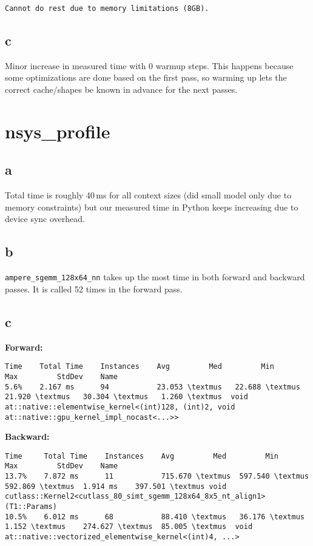 \documentclass{article}
\begin{document}
\begin{lstlisting}
Cannot do rest due to memory limitations (8GB).
\end{lstlisting}

\subsection*{c}
Minor increase in measured time with 0 warmup steps. This happens because some optimizations are done based on the first pass, so warming up lets the correct cache/shapes be known in advance for the next passes.

\newpage
\section{nsys\_profile}

\subsection*{a}
Total time is roughly 40\,ms for all context sizes (did small model only due to memory constraints) but our measured time in Python keeps increasing due to device sync overhead.

\subsection*{b}
\texttt{ampere\_sgemm\_128x64\_nn} takes up the most time in both forward and backward passes. It is called 52 times in the forward pass.

\subsection*{c}
\textbf{Forward:}
\begin{lstlisting}
Time    Total Time    Instances    Avg         Med         Min         Max         StdDev    Name
5.6%    2.167 ms      94           23.053 \textmus   22.688 \textmus   21.920 \textmus   30.304 \textmus   1.260 \textmus  void at::native::elementwise_kernel<(int)128, (int)2, void at::native::gpu_kernel_impl_nocast<...>>
\end{lstlisting}

\noindent\textbf{Backward:}
\begin{lstlisting}
Time     Total Time    Instances    Avg         Med         Min         Max         StdDev    Name
13.7%    7.872 ms      11           715.670 \textmus  597.540 \textmus  592.869 \textmus  1.914 ms    397.501 \textmus void cutlass::Kernel2<cutlass_80_simt_sgemm_128x64_8x5_nt_align1>(T1::Params)
10.5%    6.012 ms      68           88.410 \textmus   36.176 \textmus   1.152 \textmus    274.627 \textmus  85.005 \textmus  void at::native::vectorized_elementwise_kernel<(int)4, ...>
\end{lstlisting}
\end{document}
